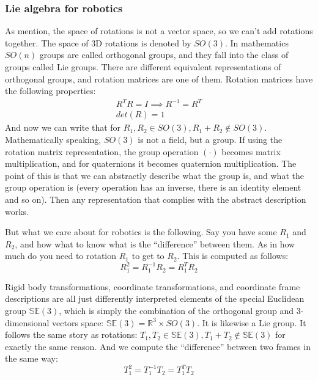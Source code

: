 \subsubsection{Lie algebra for robotics}
\label{sec-robotics-lie-algebra}
As mention, the space of rotations is not a vector space,
so we can't add rotations together.
The space of 3D rotations is denoted by $ SO (3)  $.
In mathematics $ SO (n)  $ groups are called orthogonal groups,
and they fall into the class of groups called Lie groups.
There are different equivalent representations of orthogonal groups,
and rotation matrices are one of them.
Rotation matrices have the following properties:
\begin{gather}
		R^{ T } R = I  \implies R^{ -1 } = R^{ T } \\
		det(R) = 1
\end{gather}
And now we can write that
for $ R_{ 1 }, R_{ 2 } \in SO(3), R_{ 1 } + R_{ 2 } \notin SO(3)  $.
Mathematically speaking, $ SO(3)  $ is not a field,
but a group. If using the rotation matrix representation,
the group operation $ (\cdot)  $ becomes matrix multiplication,
and for quaternions it becomes quaternion multiplication.
The point of this is that we can abstractly describe what the group is,
and what the group operation is (every operation has an inverse, there is
an identity element and so on).
Then any representation that complies with the abstract description works.

But what we care about for robotics is the following.
Say you have some $ R_{ 1 }  $ and $ R_{ 2 }  $,
and how what to know what is the ``difference'' between them.
As in how much do you need to rotation $ R_{ 1 }  $ to get to $ R_{ 2 }  $.
This is computed as follows:
\begin{equation}
R_{ 1 }^{ 2 } = R_{ 1 }^{ -1 } R_{ 2 } = R_{ 1 }^{ T } R_{ 2 }
\end{equation}

Rigid body transformations, coordinate transformations,
and coordinate frame descriptions are all just differently
interpreted elements of the special Euclidean group $ \mathbb{SE} (3)  $,
which is simply the combination of the orthogonal group and 3-dimensional
vectors space: $  \mathbb{SE} (3) = \mathbb{R}^{3} \times SO (3)   $.
It is likewise a Lie group.
It follows the same story as rotations:
$    T_{ 1 }, T_{ 2 } \in \mathbb{SE}(3), T_{ 1 } + T_{ 2 } \notin \mathbb{SE}(3)  $
for exactly the same reason.
And we compute the ``difference'' between two frames in the same way:
\begin{equation}
T_{ 1 }^{ 2 } = T_{ 1 }^{ -1 } T_{ 2 } = T_{ 1 }^{ T } T_{ 2 }
\end{equation}

